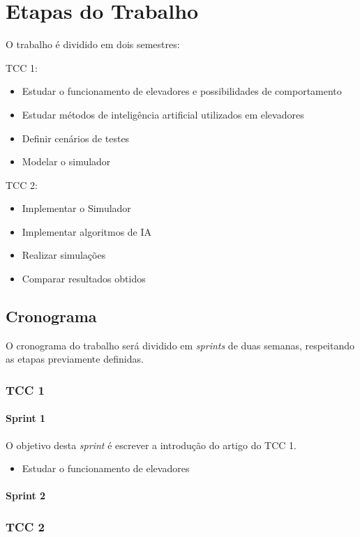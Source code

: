 \chapter{\label{chap:stages}Etapas do Trabalho}

O trabalho é dividido em dois semestres:

TCC 1:
\begin{itemize}
    \item Estudar o funcionamento de elevadores e possibilidades de comportamento
    \item Estudar métodos de inteligência artificial utilizados em elevadores
    \item Definir cenários de testes
    \item Modelar o simulador
\end{itemize}

TCC 2:
\begin{itemize}
    \item Implementar o Simulador
    \item Implementar algoritmos de IA
    \item Realizar simulações
    \item Comparar resultados obtidos
\end{itemize}

\section{Cronograma}

O cronograma do trabalho será dividido em \textit{sprints} de duas semanas,
respeitando as etapas previamente definidas.

\subsection{TCC 1}

\subsubsection{Sprint 1}
O objetivo desta \textit{sprint} é escrever a introdução do artigo do TCC 1.
\begin{itemize}
    \item Estudar o funcionamento de elevadores
\end{itemize}

\subsubsection{Sprint 2}

\subsection{TCC 2}